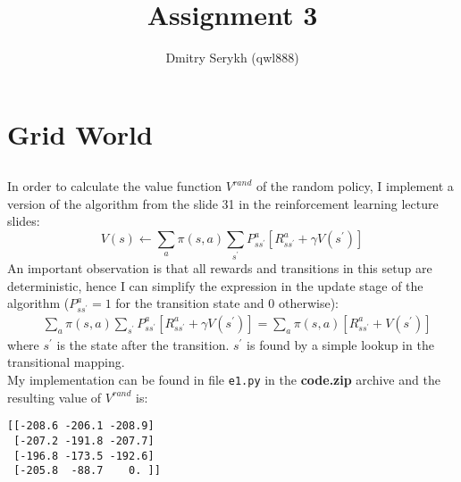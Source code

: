 \documentclass[a4paper]{article}
\title{\vspace{-5cm} Assignment 3}
\author{Dmitry Serykh (qwl888)}
\begin{document}
\maketitle


\section{Grid World}
\label{sec:1}
\subsection{}
\label{subsec:11}
In order to calculate the value function $V^{rand}$ of the random policy, I
implement a version of the algorithm from the slide 31 in the reinforcement
learning lecture slides:
$$
  V(s) \leftarrow \sum_{a} \pi(s, a)
  \sum_{s^{\prime}} P_{s s^{\prime}}^{a}\left[R_{s s^{\prime}}^{a}+\gamma
    V(s^{\prime})\right]
  $$
An important observation is that all rewards and
transitions in this setup are deterministic, hence I can simplify the expression in the update
stage of the algorithm ($P_{s s^{\prime}}^{a} = 1$ for the transition state and
0 otherwise):
\begin{align*}
  &\sum_{a} \pi(s, a) \sum_{s^{\prime}} P_{s s^{\prime}}^{a}\left[R_{s s^{\prime}}^{a}+\gamma
    V(s^{\prime})\right] = 
  \sum_{a} \pi(s, a)
  \left[R_{s s^{\prime}}^{a} + V(s^{\prime})\right]
\end{align*}
where $s^{\prime}$ is the state after the transition. $s^{\prime}$ is found
by a simple lookup in the transitional mapping.\\
My implementation can be found in file \texttt{e1.py} in the \textbf{code.zip}
archive and the resulting value of $V^{rand}$ is:
\begin{verbatim}
[[-208.6 -206.1 -208.9]
 [-207.2 -191.8 -207.7]
 [-196.8 -173.5 -192.6]
 [-205.8  -88.7    0. ]]
\end{verbatim}
\end{document}
